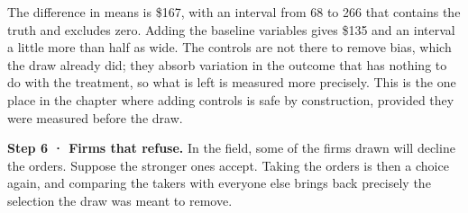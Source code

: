 \documentclass[
  letterpaper,
  10pt,
  twoside,
  openright,
  numbers=noenddot,
  chapterprefix=true]{scrbook}
\begin{document}
The difference in means is \$167, with an interval from 68 to 266 that
contains the truth and excludes zero. Adding the baseline variables
gives \$135 and an interval a little more than half as wide. The
controls are not there to remove bias, which the draw already did; they
absorb variation in the outcome that has nothing to do with the
treatment, so what is left is measured more precisely. This is the one
place in the chapter where adding controls is safe by construction,
provided they were measured before the draw.

\textbf{Step 6 · Firms that refuse.} In the field, some of the firms
drawn will decline the orders. Suppose the stronger ones accept. Taking
the orders is then a choice again, and comparing the takers with
everyone else brings back precisely the selection the draw was meant to
remove.
\end{document}

